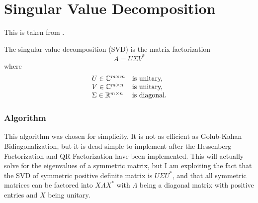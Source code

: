 \section{Singular Value Decomposition}

This is taken from \cite{NumLinAlg}.

The singular value decomposition  (SVD) is the matrix factorization 
\begin{equation}
A=U\Sigma V^*
\label{eq:NLA:SVD}
\end{equation}
where
\[
\begin{array}{ll}
U\in{\mathbb C}^{m\times m}& \text{is unitary,}\\
V\in{\mathbb C}^{m\times n}& \text{is unitary,}\\
\Sigma\in{\mathbb R}^{m\times n} &\text{is diagonal.}
\end{array}
\]

\subsubsection{Algorithm}

%
%

This algorithm was chosen for simplicity.  It is not as efficient as Golub-Kahan Bidiagonalization, but it is dead simple to implement after the Hessenberg Factorization and QR Factorization have been implemented. This will actually solve for the eigenvalues of a symmetric matrix, but I am exploiting the fact that the SVD of symmetric positive definite matrix is $U\Sigma U^*$, and that all symmetric matrices can be factored into $X\Lambda X^{*}$ with $\Lambda$ being a diagonal matrix with positive entries and $X$ being unitary.


